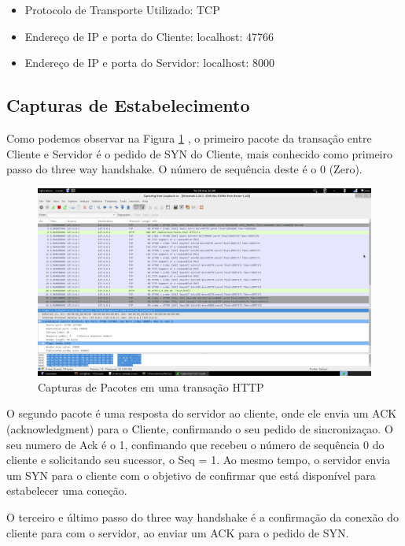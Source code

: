 \begin{itemize}

    \item Protocolo de Transporte Utilizado: TCP

    \item Endereço de IP e porta do Cliente: localhost: 47766

    \item Endereço de IP e porta do Servidor: localhost: 8000

\end{itemize}

\subsection{Capturas de Estabelecimento}
Como podemos observar na Figura \ref{fig:http} , o primeiro pacote da transação entre Cliente e Servidor é o
pedido de SYN do Cliente, mais conhecido como primeiro passo do three way handshake. O número de
  sequência deste é o 0 (Zero).

  \begin{figure}[h]
    \centering

    \includegraphics[width=450px, scale=1]{figuras/http}
    \caption{Capturas de Pacotes em uma transação HTTP}

 \label{fig:http}
  \end{figure}

O segundo pacote é uma resposta do servidor ao cliente, onde ele envia um ACK (acknowledgment)
para o Cliente, confirmando o seu pedido de sincronizaçao. O seu numero de Ack é o 1, confimando
que recebeu o número de sequência 0 do cliente e solicitando seu sucessor, o Seq = 1. Ao mesmo tempo,
  o servidor envia um SYN para o cliente com o objetivo de confirmar que está disponível para
  estabelecer uma coneção.

O terceiro e último passo do three way handshake é a confirmação da conexão do cliente para com o
servidor, ao enviar um ACK para o pedido de SYN.

